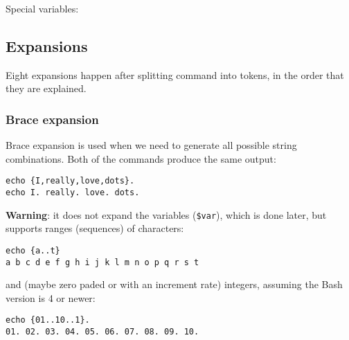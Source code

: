 Special variables:

\subsection{Expansions}
Eight expansions happen after splitting command into tokens, in the order that they are explained.

\subsubsection{Brace expansion}
Brace expansion is used when we need to generate all possible string combinations.
Both of the commands produce the same output:
\begin{verbatim}
echo {I,really,love,dots}.
echo I. really. love. dots.
\end{verbatim}

\textbf{Warning}: it does not expand the variables (\texttt{\$var}), which is done later, but supports ranges (sequences) of characters:
\begin{verbatim}
echo {a..t}
a b c d e f g h i j k l m n o p q r s t
\end{verbatim}

and (maybe zero paded or with an increment rate) integers, assuming the Bash version is 4 or newer:

\begin{verbatim}
echo {01..10..1}.
01. 02. 03. 04. 05. 06. 07. 08. 09. 10.
\end{verbatim}

